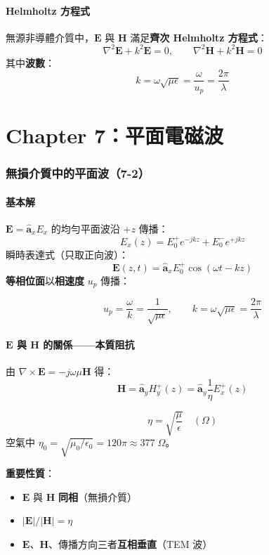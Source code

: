 \documentclass[12pt,a4paper]{article}
\newcommand{\vE}{\mathbf{E}}
\newcommand{\vH}{\mathbf{H}}
\newcommand{\ax}{\hat{\mathbf{a}}_x}
\newcommand{\ay}{\hat{\mathbf{a}}_y}
\begin{document}
\subsection{Helmholtz 方程式}

無源非導體介質中，$\vE$ 與 $\vH$ 滿足\textbf{齊次 Helmholtz 方程式}：
\[
\nabla^2\vE + k^2\vE = 0, \qquad \nabla^2\vH + k^2\vH = 0
\]
其中\textbf{波數}：
\[
k = \omega\sqrt{\mu\epsilon} = \frac{\omega}{u_p} = \frac{2\pi}{\lambda}
\]


\newpage
\part{Chapter 7：平面電磁波}

\section{無損介質中的平面波（7-2）}

\subsection{基本解}

$\vE = \ax E_x$ 的均勻平面波沿 $+z$ 傳播：
\[
E_x(z) = E_0^+ e^{-jkz} + E_0^- e^{+jkz}
\]
瞬時表達式（只取正向波）：
\[
\vE(z,t) = \ax E_0^+\cos(\omega t - kz)
\]
\textbf{等相位面}以\textbf{相速度} $u_p$ 傳播：

\begin{keybox}[相速度與波數]
\[
u_p = \frac{\omega}{k} = \frac{1}{\sqrt{\mu\epsilon}}, \qquad
k = \omega\sqrt{\mu\epsilon} = \frac{2\pi}{\lambda}
\]
\end{keybox}

\subsection{$\vE$ 與 $\vH$ 的關係——本質阻抗}

由 $\nabla\times\vE = -j\omega\mu\vH$ 得：
\[
\vH = \ay H_y^+(z) = \ay\frac{1}{\eta}E_x^+(z)
\]

\begin{keybox}
\[
\eta = \sqrt{\frac{\mu}{\epsilon}} \quad(\Omega)
\]
空氣中 $\eta_0 = \sqrt{\mu_0/\epsilon_0} = 120\pi \approx 377\;\Omega$。

\textbf{重要性質}：
\begin{itemize}[nosep]
  \item $\vE$ 與 $\vH$ \textbf{同相}（無損介質）
  \item $|\vE|/|\vH| = \eta$
  \item $\vE$、$\vH$、傳播方向三者\textbf{互相垂直}（TEM 波）
\end{itemize}
\end{keybox}
\end{document}
